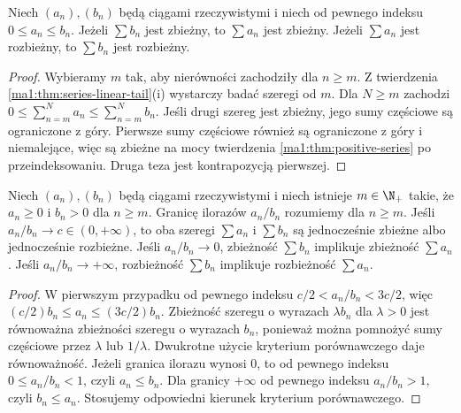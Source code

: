 \begin{twierdzenie}
\label{ma1:thm:series-comparison}
Niech $(a_n),(b_n)$ będą ciągami rzeczywistymi i niech od pewnego indeksu $0\le a_n\le b_n$. Jeżeli $\sum b_n$ jest zbieżny, to $\sum a_n$ jest zbieżny. Jeżeli $\sum a_n$ jest rozbieżny, to $\sum b_n$ jest rozbieżny.
\end{twierdzenie}
\begin{proof}
Wybieramy $m$ tak, aby nierówności zachodziły dla $n\ge m$. Z twierdzenia \ref{ma1:thm:series-linear-tail}(i) wystarczy badać szeregi od $m$. Dla $N\ge m$ zachodzi $0\le\sum_{n=m}^N a_n\le\sum_{n=m}^N b_n$. Jeśli drugi szereg jest zbieżny, jego sumy częściowe są ograniczone z góry. Pierwsze sumy częściowe również są ograniczone z góry i niemalejące, więc są zbieżne na mocy twierdzenia \ref{ma1:thm:positive-series} po przeindeksowaniu. Druga teza jest kontrapozycją pierwszej.
\end{proof}

\begin{wniosek}
\label{ma1:cor:limit-comparison}
Niech $(a_n),(b_n)$ będą ciągami rzeczywistymi i niech istnieje $m\in\N_+$ takie, że $a_n\ge0$ i $b_n>0$ dla $n\ge m$. Granicę ilorazów $a_n/b_n$ rozumiemy dla $n\ge m$. Jeśli $a_n/b_n\to c\in(0,+\infty)$, to oba szeregi $\sum a_n$ i $\sum b_n$ są jednocześnie zbieżne albo jednocześnie rozbieżne. Jeśli $a_n/b_n\to0$, zbieżność $\sum b_n$ implikuje zbieżność $\sum a_n$. Jeśli $a_n/b_n\to+\infty$, rozbieżność $\sum b_n$ implikuje rozbieżność $\sum a_n$.
\end{wniosek}
\begin{proof}
W pierwszym przypadku od pewnego indeksu $c/2<a_n/b_n<3c/2$, więc $(c/2)b_n\le a_n\le(3c/2)b_n$. Zbieżność szeregu o wyrazach $\lambda b_n$ dla $\lambda>0$ jest równoważna zbieżności szeregu o wyrazach $b_n$, ponieważ można pomnożyć sumy częściowe przez $\lambda$ lub $1/\lambda$. Dwukrotne użycie kryterium porównawczego daje równoważność.
Jeżeli granica ilorazu wynosi $0$, to od pewnego indeksu $0\le a_n/b_n<1$, czyli $a_n\le b_n$. Dla granicy $+\infty$ od pewnego indeksu $a_n/b_n>1$, czyli $b_n\le a_n$. Stosujemy odpowiedni kierunek kryterium porównawczego.
\end{proof}

